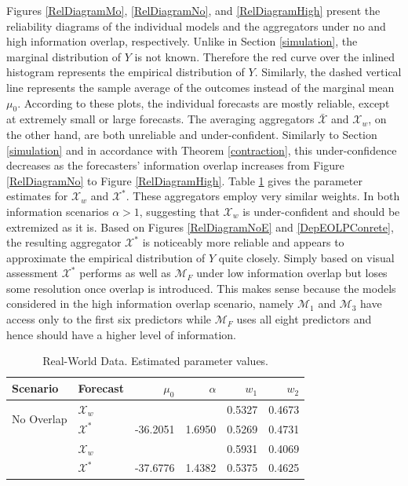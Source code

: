 \documentclass[11pt]{article}
\theoremstyle{definition}
\theoremstyle{definition}
\begin{document}
Figures \ref{RelDiagramMo}, \ref{RelDiagramNo}, and \ref{RelDiagramHigh} present the reliability diagrams of the individual models and the aggregators under no and high information overlap, respectively. Unlike in Section \ref{simulation}, the marginal distribution of $Y$ is not known. Therefore the red curve over the inlined histogram represents the empirical distribution of $Y$. Similarly, the dashed vertical line represents the sample average of the outcomes instead of the marginal mean $\mu_0$. According to these plots, the individual forecasts are mostly reliable, except at extremely small or large forecasts. The averaging aggregators $\bar{\mathcal{X}}$ and $\mathcal{X}_w$, on the other hand, are both unreliable and under-confident. Similarly to Section \ref{simulation} and in accordance with Theorem \ref{contraction}, this under-confidence decreases as the forecasters' information overlap increases from Figure  \ref{RelDiagramNo} to Figure \ref{RelDiagramHigh}.  Table \ref{NoParamsReal} gives the parameter estimates for $\mathcal{X}_w$ and $\mathcal{X}^*$. These aggregators employ very similar weights. In both information scenarios $\alpha > 1$, suggesting that $\mathcal{X}_w$ is under-confident and should be extremized as it is. Based on Figures \ref{RelDiagramNoE} and  \ref{DepEOLPConrete}, the resulting aggregator $\mathcal{X}^*$ is noticeably more reliable and appears to approximate the empirical distribution of $Y$ quite closely. Simply based on visual assessment $\mathcal{X}^*$ performs as well as $\mathcal{M}_F$ under low information overlap but  loses some resolution once  overlap is introduced. This makes sense because the models considered in the high information overlap scenario, namely $\mathcal{M}_1$ and $\mathcal{M}_3$ have access only to the first six predictors while $\mathcal{M}_F$ uses all eight predictors and hence should have a higher level of information. 



\begin{table}[ht]
\centering
\caption{Real-World Data. Estimated parameter values.} 
\begin{tabular}{llrrrr}
   \hline \hline
Scenario & Forecast & $\mu_0$ & $\alpha$ & $w_1$ & $w_2$\\
  \hline
\multirow{2}{*}{No Overlap} & $\mathcal{X}_w$ &  &  & 0.5327 & 0.4673 \\ 
&  $\mathcal{X}^*$ & -36.2051 & 1.6950 & 0.5269 & 0.4731 \\  \rule{0pt}{2.9ex} 
\hspace{-0.2em}\multirow{2}{*}{High Overlap}  & $\mathcal{X}_w$ &  &  & 0.5931 & 0.4069 \\ 
 & $\mathcal{X}^*$ & -37.6776 & 1.4382 & 0.5375 & 0.4625 \\ 
   \hline
\end{tabular}
\label{NoParamsReal}
\end{table}
\end{document}
